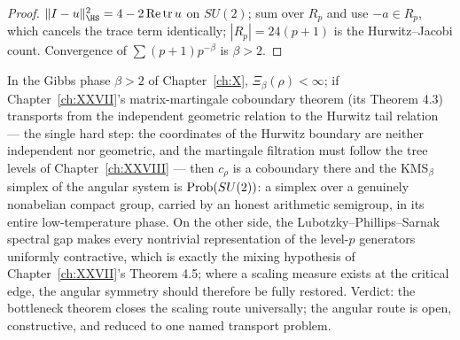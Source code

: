 \begin{proof}
$\|I-u\|^2_{\HS}=4-2\,\mathrm{Re}\,\mathrm{tr}\,u$ on $SU(2)$; sum over $R_p$ and use
$-a\in R_p$, which cancels the trace term identically; $|R_p|=24(p{+}1)$ is the
Hurwitz--Jacobi count. Convergence of $\sum(p{+}1)p^{-\beta}$ is $\beta>2$.
\end{proof}

\begin{remark}\label{XXXIV:rem:programme}
In the Gibbs phase $\beta>2$ of Chapter~\ref{ch:X}, $\Xi_\beta(\rho)<\infty$; if Chapter~\ref{ch:XXVII}'s
matrix-martingale coboundary theorem (its Theorem 4.3) transports from the independent
geometric relation to the Hurwitz tail relation --- the single hard step: the
coordinates of the Hurwitz boundary are neither independent nor geometric, and the
martingale filtration must follow the tree levels of Chapter~\ref{ch:XXVIII} --- then $c_\rho$ is a
coboundary there and the KMS$_\beta$ simplex of the angular system is
$\mathrm{Prob}(SU(2))$: a simplex over a genuinely nonabelian compact group, carried by an
honest arithmetic semigroup, in its entire low-temperature phase. On the other side, the
Lubotzky--Phillips--Sarnak spectral gap \cite{LPS} makes every nontrivial representation
of the level-$p$ generators uniformly contractive, which is exactly the mixing hypothesis
of Chapter~\ref{ch:XXVII}'s Theorem 4.5; where a scaling measure exists at the critical edge, the
angular symmetry should therefore be fully restored. Verdict: the bottleneck theorem
closes the scaling route universally; the angular route is open, constructive, and
reduced to one named transport problem.
\end{remark}

